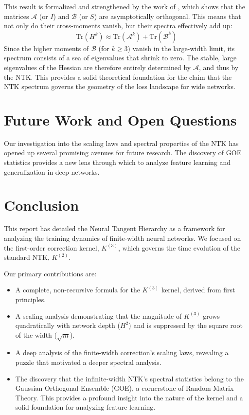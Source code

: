 \documentclass{article}
\begin{document}
This result is formalized and strengthened by the work of \cite{jacot2020kernelhessian}, which shows that the matrices $\mathcal{A}$ (or $I$) and $\mathcal{B}$ (or $S$) are asymptotically orthogonal. This means that not only do their cross-moments vanish, but their spectra effectively add up:
\begin{equation}
\mathrm{Tr}(H^k) \approx \mathrm{Tr}(\mathcal{A}^k) + \mathrm{Tr}(\mathcal{B}^k)
\end{equation}
Since the higher moments of $\mathcal{B}$ (for $k \ge 3$) vanish in the large-width limit, its spectrum consists of a sea of eigenvalues that shrink to zero. The stable, large eigenvalues of the Hessian are therefore entirely determined by $\mathcal{A}$, and thus by the NTK. This provides a solid theoretical foundation for the claim that the NTK spectrum governs the geometry of the loss landscape for wide networks.

\newpage
\section{Future Work and Open Questions}

Our investigation into the scaling laws and spectral properties of the NTK has opened up several promising avenues for future research. The discovery of GOE statistics provides a new lens through which to analyze feature learning and generalization in deep networks.

\newpage
\section{Conclusion}

This report has detailed the Neural Tangent Hierarchy as a framework for analyzing the training dynamics of finite-width neural networks. We focused on the first-order correction kernel, $K^{(3)}$, which governs the time evolution of the standard NTK, $K^{(2)}$.

Our primary contributions are:
\begin{itemize}
    \item A complete, non-recursive formula for the $K^{(3)}$ kernel, derived from first principles.
    \item A scaling analysis demonstrating that the magnitude of $K^{(3)}$ grows quadratically with network depth ($H^2$) and is suppressed by the square root of the width ($\sqrt{m}$).
    \item A deep analysis of the finite-width correction's scaling laws, revealing a puzzle that motivated a deeper spectral analysis.
    \item The discovery that the infinite-width NTK's spectral statistics belong to the Gaussian Orthogonal Ensemble (GOE), a cornerstone of Random Matrix Theory. This provides a profound insight into the nature of the kernel and a solid foundation for analyzing feature learning.
\end{itemize}
\end{document}
